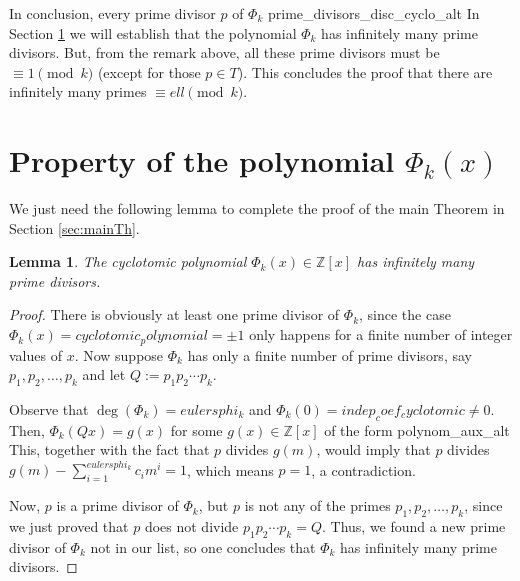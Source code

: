 \documentclass[a4paper, 12pt]{article}
\newtheorem{lemma}[theorem]{Lemma}
\theoremstyle{definition}
\newcommand{\Z}{\ensuremath{\mathbb{Z}}}
\DeclareMathOperator{\degpol}{deg} %
\begin{document}
In conclusion, every prime divisor $p$ of $\Phi_{{k}}$ {prime_divisors_disc_cyclo_alt} In Section \ref{sec:properties} we will establish that the polynomial $\Phi_{{k}}$ has infinitely many prime divisors. But, from the remark above, all these prime divisors must be $\equiv 1\pmod{{k}}$ (except for those $p\in T$). This concludes the proof that there are infinitely many primes $\equiv {ell} \pmod{{k}}$.

\section{Property of the polynomial \texorpdfstring{$\Phi_{{k}}(x)$}{Pkx}}\label{sec:properties}

We just need the following lemma to complete the proof of the main Theorem in Section \ref{sec:mainTh}.

\begin{lemma}
The cyclotomic polynomial $\Phi_{{k}}(x)\in\Z[x]$ has infinitely many prime divisors.
\end{lemma}
\begin{proof}
There is obviously at least one prime divisor of $\Phi_{{k}}$, since the case $\Phi_{{k}}(x)={cyclotomic_polynomial}=\pm 1$ only happens for a finite number of integer values of $x$. Now suppose $\Phi_{{k}}$ has only a finite number of prime divisors, say $p_1, p_2,\dots,p_k$ and let $Q:=p_1p_2\cdots p_k$. 

Observe that $\degpol(\Phi_{{k}})={eulersphi_k}$ and $\Phi_{{k}}(0)={indep_coef_cyclotomic}\neq 0$. Then, $\Phi_{{k}}(Qx)=g(x)$ for some $g(x)\in\Z[x]$ of the form {polynom_aux_alt} This, together with the fact that $p$ divides $g(m)$, would imply that $p$ divides $g(m) - \sum_{i=1}^{{eulersphi_k}}c_im^i=1$, which means $p=1$, a contradiction. 

Now, $p$ is a prime divisor of $\Phi_{{k}}$, but $p$ is not any of the primes $p_1,p_2,\dots,p_k$, since we just proved that $p$ does not divide $p_1p_2\cdots p_k=Q$. Thus, we found a new prime divisor of $\Phi_{{k}}$ not in our list, so one concludes that $\Phi_{{k}}$ has infinitely many prime divisors.
\end{proof}
\end{document}

